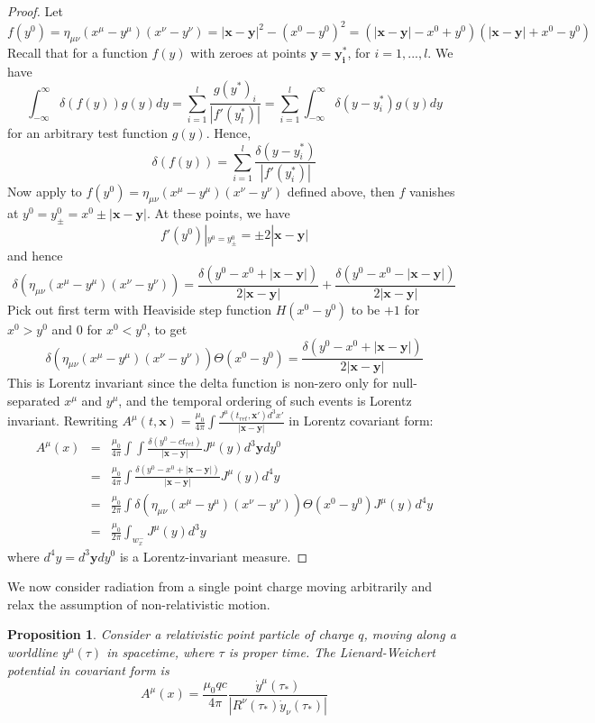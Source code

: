 \documentclass[a4paper]{article}
\theoremstyle{new}
\newtheorem{prop}{Proposition}[section]
\begin{document}
\begin{proof}
Let 
$$f(y^0)=\eta_{\mu\nu}(x^\mu-y^\mu)(x^\nu-y^\nu)=|\mathbf{x}-\mathbf{y}|^2-(x^0-y^0)^2=(|\mathbf{x}-\mathbf{y}|-x^0+y^0)(|\mathbf{x}-\mathbf{y}|+x^0-y^0)$$
Recall that for a function $f(y)$ with zeroes at points $\mathbf{y}=\mathbf{y_i^*}$, for $i=1,...,l$. We have 
$$\int_{-\infty}^\infty\delta(f(y))g(y)dy=\sum_{i=1}^l\frac{g(y^*)_i}{|f'(y_l^*)|}=\sum_{i=1}^l\int_{-\infty}^\infty\delta(y-y_i^*)g(y)dy$$
for an arbitrary test function $g(y)$. Hence,
$$\delta(f(y))=\sum_{i=1}^l\frac{\delta(y-y_i^*)}{|f'(y_i^*)|}$$
Now apply to $f(y^0)=\eta_{\mu\nu}(x^\mu-y^\mu)(x^\nu-y^\nu)$ defined above, then $f$ vanishes at $y^0=y_{\pm}^0=x^0\pm|\mathbf{x}-\mathbf{y}|$. At these points, we have
$$f'(y^0)|_{y^0=y^0_{\pm}}=\pm 2|\mathbf{x}-\mathbf{y}|$$
and hence
$$\delta(\eta_{\mu\nu}(x^\mu-y^\mu)(x^\nu-y^\nu))=\frac{\delta(y^0-x^0+|\mathbf{x}-\mathbf{y}|)}{2|\mathbf{x}-\mathbf{y}|}+\frac{\delta(y^0-x^0-|\mathbf{x}-\mathbf{y}|)}{2|\mathbf{x}-\mathbf{y}|}$$
Pick out first term with Heaviside step function $H(x^0-y^0)$ to be $+1$ for $x^0>y^0$ and 0 for $x^0<y^0$, to get
$$\delta(\eta_{\mu\nu}(x^\mu-y^\mu)(x^\nu-y^\nu))\Theta(x^0-y^0)=\frac{\delta(y^0-x^0+|\mathbf{x}-\mathbf{y}|)}{2|\mathbf{x}-\mathbf{y}|}$$
This is Lorentz invariant since the delta function is non-zero only for null-separated $x^\mu$ and $y^\mu$, and the temporal ordering of such events is Lorentz invariant. Rewriting $A^\mu(t,\mathbf{x})=\frac{\mu_0}{4\pi}\int\frac{J^\mu(t_{ret},\mathbf{x'})d^3x'}{|\mathbf{x}-\mathbf{y}|}$ in Lorentz covariant form:
\begin{eqnarray}
A^\mu(x)&=&\frac{\mu_0}{4\pi}\int\int\frac{\delta(y^0-ct_{ret})}{|\mathbf{x}-\mathbf{y}|}J^\mu(y)d^3\mathbf{y}dy^0\nonumber\\&=&\frac{\mu_0}{4\pi}\int\frac{\delta(y^0-x^0+|\mathbf{x}-\mathbf{y}|)}{|\mathbf{x}-\mathbf{y}|}J^\mu(y)d^4y\nonumber\\&=&\frac{\mu_0}{2\pi}\int\delta(\eta_{\mu\nu}(x^\mu-y^\mu)(x^\nu-y^\nu))\Theta(x^0-y^0)J^\mu(y)d^4y\nonumber\\&=&\frac{\mu_0}{2\pi}\int_{w_x^-}J^\mu(y)d^3y\nonumber
\end{eqnarray}
where $d^4y=d^3\mathbf{y}dy^0$ is a Lorentz-invariant measure.
\end{proof}
We now consider radiation from a single point charge moving arbitrarily and relax the assumption of non-relativistic motion.
\begin{prop}
Consider a relativistic point particle of charge $q$, moving along a worldline $y^\mu(\tau)$ in spacetime, where $\tau$ is proper time. The Lienard-Weichert potential in covariant form is
$$A^\mu(x)=\frac{\mu_0qc}{4\pi}\frac{\dot{y}^\mu(\tau_*)}{|R^\nu(\tau_*)\dot{y}_\nu(\tau_*)|}$$
\end{prop}
\end{document}
